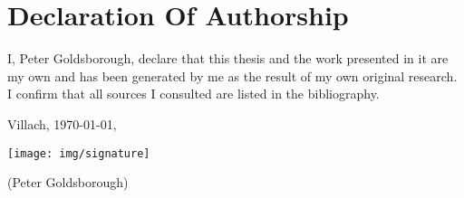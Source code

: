\chapter*{Declaration Of Authorship}

I, Peter Goldsborough, declare that this thesis and the work presented in it are my own and has been generated by me as the result of my own original research. I confirm that all sources I consulted are listed in the bibliography. \parbreak  \parbreak \parbreak \parbreak

{ \centering

Villach, \today, \parbreak \parbreak \parbreak

\texttt{[image: img/signature]} \parbreak

(Peter Goldsborough)

}

